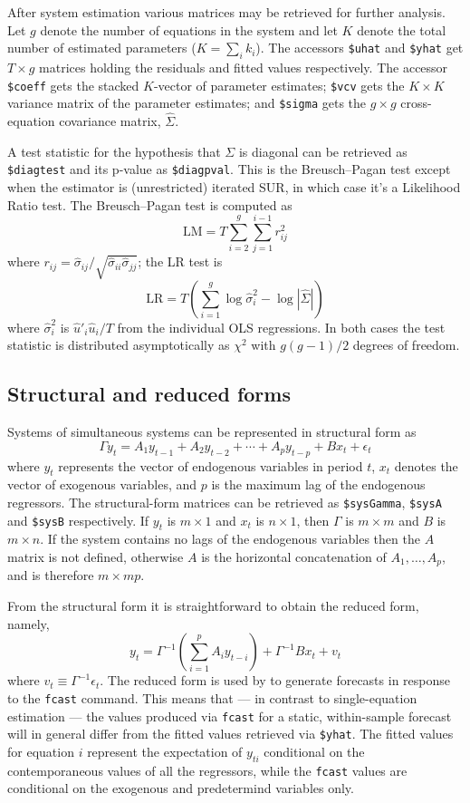 After system estimation various matrices may be retrieved for further
analysis.  Let $g$ denote the number of equations in the system and
let $K$ denote the total number of estimated parameters ($K = \sum_i
k_i$). The accessors \verb|$uhat| and \verb|$yhat| get $T \times g$
matrices holding the residuals and fitted values respectively. The
accessor \verb|$coeff| gets the stacked $K$-vector of parameter
estimates; \verb|$vcv| gets the $K \times K$ variance matrix of the
parameter estimates; and \verb|$sigma| gets the $g \times g$
cross-equation covariance matrix, $\hat{\Sigma}$.

A test statistic for the hypothesis that $\Sigma$ is diagonal can be
retrieved as \verb|$diagtest| and its p-value as
\verb|$diagpval|. This is the Breusch--Pagan test except when the
estimator is (unrestricted) iterated SUR, in which case it's a
Likelihood Ratio test. The Breusch--Pagan test is computed as
\[
\mbox{LM} = T \sum_{i=2}^g \sum_{j=1}^{i-1} r^2_{ij}
\]
where $r_{ij} = \hat{\sigma}_{ij} /
\sqrt{\hat{\sigma}_{ii}\hat{\sigma}_{jj}}$; the LR test is
\[
\mbox{LR} = T \left(\sum_{i=1}^g \log \hat{\sigma}^2_i -\log 
 |\hat{\Sigma}| \right)
\]
where $\hat{\sigma}^2_i$ is $\hat{u}'_i \hat{u}_i / T$ from the
individual OLS regressions. In both cases the test statistic is
distributed asymptotically as $\chi^2$ with $g(g-1)/2$ degrees of
freedom. 

\subsection{Structural and reduced forms}

Systems of simultaneous systems can be represented in structural form
as
\[
\Gamma y_t = A_1 y_{t-1} + A_2 y_{t-2} + \cdots + A_p y_{t-p}
 + B x_t + \epsilon_t
\]
where $y_t$ represents the vector of endogenous variables in period
$t$, $x_t$ denotes the vector of exogenous variables, and $p$ is the
maximum lag of the endogenous regressors.  The structural-form
matrices can be retrieved as \verb|$sysGamma|, \verb|$sysA| and
\verb|$sysB| respectively. If $y_t$ is $m \times 1$ and $x_t$ is $n
\times 1$, then $\Gamma$ is $m \times m$ and $B$ is $m \times n$. If
the system contains no lags of the endogenous variables then the $A$
matrix is not defined, otherwise $A$ is the horizontal concatenation
of $A_1,\dots,A_p$, and is therefore $m \times mp$.

From the structural form it is straightforward to obtain the reduced
form, namely,
\[
y_t = \Gamma^{-1} \left(\sum_{i=1}^p A_i y_{t-i}\right)
 + \Gamma^{-1} B x_t + v_t
\]
where $v_t \equiv \Gamma^{-1}\epsilon_t$. The reduced form is used by
 to generate forecasts in response to the \texttt{fcast}
command. This means that --- in contrast to single-equation estimation
--- the values produced via \texttt{fcast} for a static, within-sample
forecast will in general differ from the fitted values retrieved via
\verb|$yhat|. The fitted values for equation $i$ represent the
expectation of $y_{ti}$ conditional on the contemporaneous values of
all the regressors, while the \texttt{fcast} values are conditional on
the exogenous and predetermind variables only.


